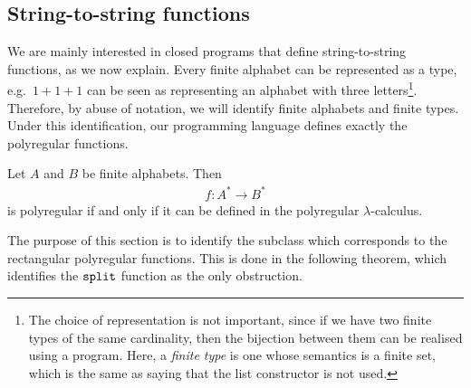 \documentclass[a4paper,UKenglish,cleveref, autoref, thm-restate]{lipics-v2021}
\begin{document}
\subsection{String-to-string functions} 
We are mainly interested in closed programs that define string-to-string functions, as we now explain. 
  Every finite alphabet can be represented as a type, e.g.~$1 + 1 + 1$ can be seen as representing an alphabet with three letters\footnote{The choice of representation is not important, since if we have two finite types of the same cardinality, then the bijection between them can be realised using a program. Here, a \emph{finite type}  is one whose semantics is a finite set, which is the same as saying that the list constructor is not used.}. Therefore, by abuse of notation, we will identify finite alphabets and finite types. Under this identification, our programming language defines exactly the polyregular functions.
  
  \begin{theorem}
      Let $A$ and $B$ be finite alphabets. Then
        \begin{align*}
    f : A^* \to B^*
    \end{align*}
    is polyregular if and only if it can be defined in the polyregular $\lambda$-calculus.
    \end{theorem}
The purpose of this section is to identify the subclass which corresponds to the rectangular polyregular functions. This is done in the following theorem, which identifies the $\mathtt{split}$ function as the only obstruction.
\end{document}
